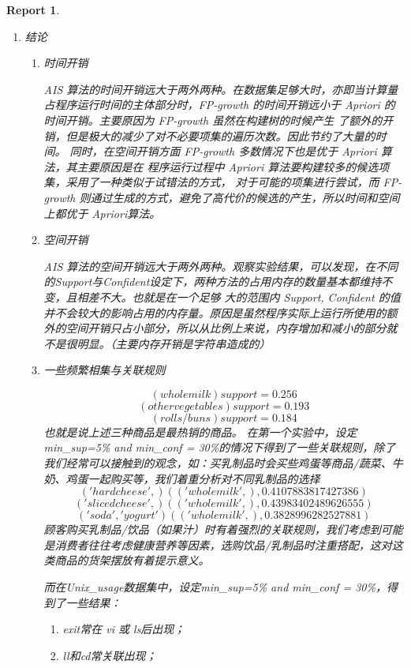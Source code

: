 \documentclass[a4paper,UTF8]{article}
\numberwithin{equation}{section}
\newtheorem*{mySol}{Report}
\begin{document}
\begin{mySol}
\begin{enumerate}
\item 结论
\begin{enumerate}
\item[1] 时间开销
\par AIS 算法的时间开销远大于两外两种。在数据集足够大时，亦即当计算量占程序运行时间的主体部分时，FP-growth 的时间开销远小于 Apriori 的时间开销。主要原因为 FP-growth 虽然在构建树的时候产生 了额外的开销，但是极大的减少了对不必要项集的遍历次数。因此节约了大量的时间。 同时，在空间开销方面 FP-growth 多数情况下也是优于 Apriori 算法，其主要原因是在 程序运行过程中 Apriori 算法要构建较多的候选项集，采用了一种类似于试错法的方式， 对于可能的项集进行尝试，而 FP-growth 则通过生成的方式，避免了高代价的候选的产生，所以时间和空间上都优于 Apriori算法。
\item[2] 空间开销
\par
AIS 算法的空间开销远大于两外两种。观察实验结果，可以发现，在不同的Support与Confident设定下，两种方法的占用内存的数量基本都维持不变，且相差不大。也就是在一个足够 大的范围内 Support, Confident 的值并不会较大的影响占用的内存量。原因是虽然程序实际上运行所使用的额外的空间开销只占小部分，所以从比例上来说，内存增加和减小的部分就不是很明显。（主要内存开销是字符串造成的）
\item[3] 一些频繁相集与关联规则
\par
\[ (whole milk)  support = 0.256 \]
\[ (other vegetables)  support = 0.193 \]
\[ (rolls/buns)  support = 0.184 \]
也就是说上述三种商品是最热销的商品。
在第一个实验中，设定min\_sup=5\% and min\_conf = 30\%的情况下得到了一些关联规则，除了我们经常可以接触到的观念，如：买乳制品时会买些鸡蛋等商品/蔬菜、牛奶、鸡蛋一起购买等，我们着重分析对不同乳制品的选择
\[('hard cheese',) (('whole milk',), 0.4107883817427386) \]
\[ ('sliced cheese',) (('whole milk',), 0.43983402489626555)\]
\[ ('soda', 'yogurt') (('whole milk',), 0.3828996282527881)\]
顾客购买乳制品/饮品（如果汁）时有着强烈的关联规则，我们考虑到可能是消费者往往考虑健康营养等因素，选购饮品/乳制品时注重搭配，这对这类商品的货架摆放有着提示意义。

\par
而在Unix\_usage数据集中，设定min\_sup=5\% and min\_conf = 30\%，得到了一些结果：
\begin{enumerate}
\item exit常在 vi 或 ls后出现；
\item ll和cd常关联出现；
\end{enumerate}

\end{enumerate}
\end{enumerate}
\end{mySol}
\end{document}

